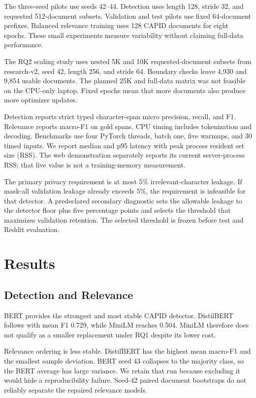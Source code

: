 \documentclass[conference]{IEEEtran}
\begin{document}
The three-seed pilots use seeds 42--44. Detection uses length 128, stride 32, and requested 512-document subsets. Validation and test pilots use fixed 64-document prefixes. Balanced relevance training uses 128 CAPID documents for eight epochs. These small experiments measure variability without claiming full-data performance.

The RQ2 scaling study uses nested 5K and 10K requested-document subsets from research-v2, seed 42, length 256, and stride 64. Boundary checks leave 4,930 and 9,854 usable documents. The planned 25K and full-data matrix was not feasible on the CPU-only laptop. Fixed epochs mean that more documents also produce more optimizer updates.

Detection reports strict typed character-span micro precision, recall, and F1. Relevance reports macro-F1 on gold spans. CPU timing includes tokenization and decoding. Benchmarks use four PyTorch threads, batch one, five warmups, and 30 timed inputs. We report median and p95 latency with peak process resident set size (RSS). The web demonstration separately reports its current server-process RSS; that live value is not a training-memory measurement.

The primary privacy requirement is at most 5\% irrelevant-character leakage. If mask-all validation leakage already exceeds 5\%, the requirement is infeasible for that detector. A predeclared secondary diagnostic sets the allowable leakage to the detector floor plus five percentage points and selects the threshold that maximizes validation retention. The selected threshold is frozen before test and Reddit evaluation.

\section{Results}

\subsection{Detection and Relevance}
BERT provides the strongest and most stable CAPID detector. DistilBERT follows with mean F1 0.729, while MiniLM reaches 0.504. MiniLM therefore does not qualify as a smaller replacement under RQ1 despite its lower cost.

Relevance ordering is less stable. DistilBERT has the highest mean macro-F1 and the smallest sample deviation. BERT seed 43 collapses to the majority class, so the BERT average has large variance. We retain that run because excluding it would hide a reproducibility failure. Seed-42 paired document bootstraps do not reliably separate the repaired relevance models.
\end{document}
